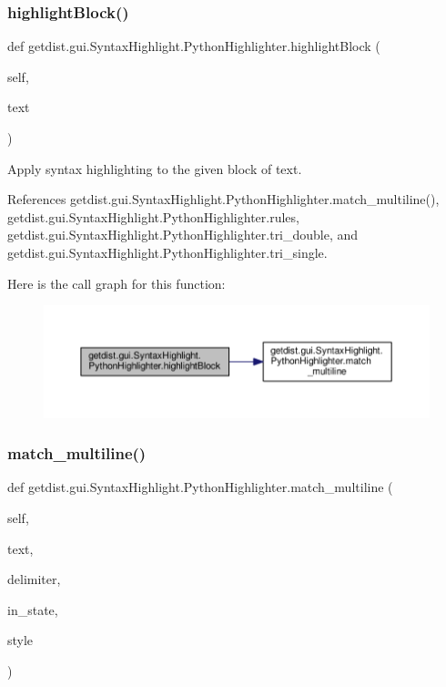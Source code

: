\subsubsection{\texorpdfstring{highlight\+Block()}{highlightBlock()}}
{\footnotesize\ttfamily def getdist.\+gui.\+Syntax\+Highlight.\+Python\+Highlighter.\+highlight\+Block (\begin{DoxyParamCaption}\item[{}]{self,  }\item[{}]{text }\end{DoxyParamCaption})}

\begin{DoxyVerb}Apply syntax highlighting to the given block of text.
\end{DoxyVerb}
 

References getdist.\+gui.\+Syntax\+Highlight.\+Python\+Highlighter.\+match\+\_\+multiline(), getdist.\+gui.\+Syntax\+Highlight.\+Python\+Highlighter.\+rules, getdist.\+gui.\+Syntax\+Highlight.\+Python\+Highlighter.\+tri\+\_\+double, and getdist.\+gui.\+Syntax\+Highlight.\+Python\+Highlighter.\+tri\+\_\+single.

Here is the call graph for this function\+:
\nopagebreak
\begin{figure}[H]
\begin{center}
\leavevmode
\includegraphics[width=350pt]{classgetdist_1_1gui_1_1SyntaxHighlight_1_1PythonHighlighter_af158d6f9127e55af91d7467978feffaf_cgraph}
\end{center}
\end{figure}
\mbox{\label{classgetdist_1_1gui_1_1SyntaxHighlight_1_1PythonHighlighter_a5407f7f702169da64d32c85cd0c25001}} 
\subsubsection{\texorpdfstring{match\+\_\+multiline()}{match\_multiline()}}
{\footnotesize\ttfamily def getdist.\+gui.\+Syntax\+Highlight.\+Python\+Highlighter.\+match\+\_\+multiline (\begin{DoxyParamCaption}\item[{}]{self,  }\item[{}]{text,  }\item[{}]{delimiter,  }\item[{}]{in\+\_\+state,  }\item[{}]{style }\end{DoxyParamCaption})}

